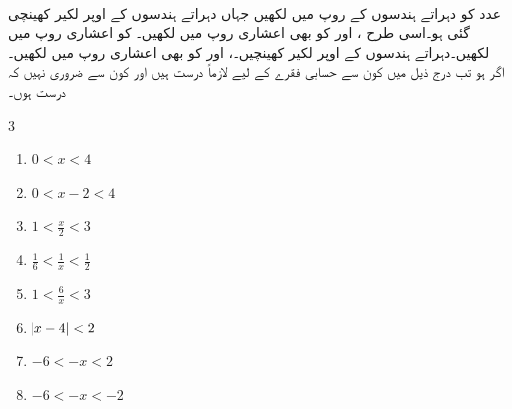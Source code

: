 \\
عدد  کو دہراتے ہندسوں کے روپ میں لکھیں جہاں دہراتے ہندسوں کے اوپر لکیر کھینچی گئی ہو۔اسی طرح ،  اور  کو بھی اعشاری روپ میں لکھیں۔
 کو اعشاری روپ میں لکھیں۔دہراتے ہندسوں کے اوپر لکیر کھینچیں۔،  اور  کو بھی اعشاری روپ میں لکھیں۔
\\
اگر  ہو تب درج ذیل میں کون سے حسابی فقرے  کے لیے لازماً درست ہیں اور کون سے ضروری نہیں کہ درست ہوں۔
\begin{multicols}{3}
\begin{enumerate}[a]
\item
$0<x<4 $
\item
$0<x-2<4$
\item
$1<\tfrac{x}{2}<3$
\item
$\tfrac{1}{6}<\tfrac{1}{x}<\tfrac{1}{2}$
\item
$1<\tfrac{6}{x}<3$
\item
$\abs{x-4}<2$
\item
$-6<-x<2$
\item
$ -6<-x<-2$
\end{enumerate}
\end{multicols}

